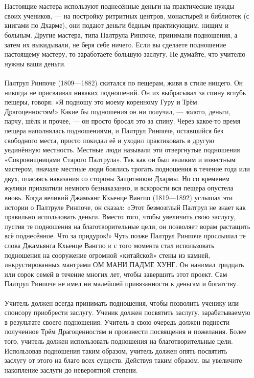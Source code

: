 \\ \\ Настоящие мастера используют поднесённые деньги на практические нужды своих учеников, — на постройку ритритных центров, монастырей и библиотек (с книгами по Дхарме), они подают деньги бедным практикующим, нищим и больным. Другие мастера, типа Палтрула Ринпоче, принимали подношения, а затем их выкидывали, не беря себе ничего. Если вы сделаете подношение настоящему мастеру, то заработаете большую заслугу. Не думайте, что учителю нужны ваши деньги.
\\ \\ Палтрул Ринпоче (1809—1882) скитался по пещерам, живя в стиле нищего. Он никогда не присваивал никаких подношений. Он их выбрасывал за спину вглубь пещеры, говоря: «Я подношу это моему коренному Гуру и Трём Драгоценностям!» Какие бы подношения он ни получал, — золото, деньги, парчу, шёлк и прочее, — он просто бросал это за спину. Через какое-то время пещера наполнялась подношениями, и Палтрул Ринпоче, оставшийся без свободного места, просто покидал её и уходил практиковать в другую уединённую местность. Местные люди называли эти отвергнутые подношения «Сокровищницами Старого Палтрула». Так как он был великим и известным мастером, вначале местные люди боялись трогать подношения в течение года или двух, опасаясь наказания со стороны Защитников Дхармы. Но со временем жулики прихватили немного безнаказанно, и вскорости вся пещера опустела вновь. Когда великий Джамьянг Кхьенце Вангпо (1819—1892) услышал эти истории о Палтруле Ринпоче, он сказал: «Этот безмозглый Палтрул не знает как правильно использовать деньги. Вместо того, чтобы увеличить свою заслугу, пустив те подношения на благотворительные цели, он позволяет ворам растащить всё поднесённое. Что за придурок!» Чуть позже Палтрул Ринпоче прослышал те слова Джамьянга Кхьенце Вангпо и с того момента стал использовать подношения на сооружение огромной «китайской» стены из камней, инкрустированных мантрами ОМ МАНИ ПАДМЕ ХУНГ. Он нанимал тридцать или сорок семей в течение многих лет, чтобы завершить этот проект. Сам Палтрул Ринпоче не имел ни малейшей привязанности к деньгам и богатству.
\\ \\ Учитель должен всегда принимать подношения, чтобы позволить ученику или спонсору приобрести заслугу. Ученик должен посвятить заслугу, зарабатываемую в результате своего подношения. Учитель в свою очередь должен поднести полученное Трём Драгоценностям и произнести посвящения и пожелания. Более того, учитель должен использовать подношения на благотворительные цели. Использовав подношения таким образом, учитель должен опять посвятить заслугу от этого на благо всех существ. Действуя таким образом, вы увеличите накопление заслуги до невероятной степени.
